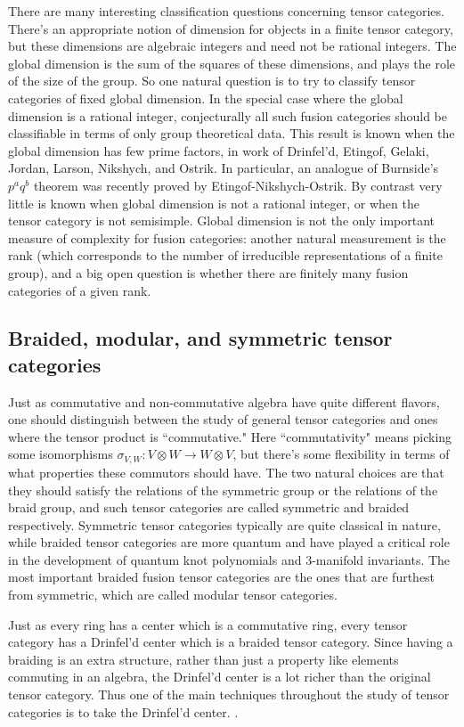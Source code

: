 \documentclass[12pt]{article}
\begin{document}
There are many interesting classification questions concerning tensor categories. There's an appropriate notion of dimension for objects in a finite tensor category, but these dimensions are algebraic integers and need not be rational integers. The global dimension is the sum of the squares of these dimensions, and plays the role of the size of the group. So one natural question is to try to classify tensor categories of fixed global dimension. In the special case where the global dimension is a rational integer, conjecturally all such fusion categories should be classifiable in terms of only group theoretical data.  This result is known when the global dimension has few prime factors, in work of Drinfel'd, Etingof, Gelaki, Jordan, Larson, Nikshych, and Ostrik. In particular, an analogue of Burnside's $p^a q^b$ theorem was recently proved by Etingof-Nikshych-Ostrik. By contrast very little is known when global dimension is not a rational integer, or when the tensor category is not semisimple. Global dimension is not the only important measure of complexity for fusion categories: another natural measurement is the rank (which corresponds to the number of irreducible representations of a finite group), and a big open question is whether there are finitely many fusion categories of a given rank.


\subsection{Braided, modular, and symmetric tensor categories}
Just as  commutative and non-commutative algebra have quite different flavors, one should distinguish between the study of general tensor categories and ones where the tensor product is ``commutative." Here ``commutativity" means picking some isomorphisms $\sigma_{V,W}: V \otimes W \rightarrow W \otimes V$, but there's some flexibility in terms of what properties these commutors should have. The two natural choices are that they should satisfy the relations of the symmetric group or the relations of the braid group, and such tensor categories are called symmetric and braided respectively. Symmetric tensor categories typically are quite classical in nature, while braided tensor categories are more quantum and have played a critical role in the development of quantum knot polynomials and 3-manifold invariants. The most important braided fusion tensor categories are the ones that are furthest from symmetric, which are called modular tensor categories.

Just as every ring has a center which is a commutative ring, every tensor category has a Drinfel'd center which is a braided tensor category. Since having a braiding is an extra structure, rather than just a property like elements commuting in an algebra, the Drinfel'd center is a lot richer than the original tensor category. Thus one of the main techniques throughout the study of tensor  categories is to take the Drinfel'd center. . 
\end{document}
